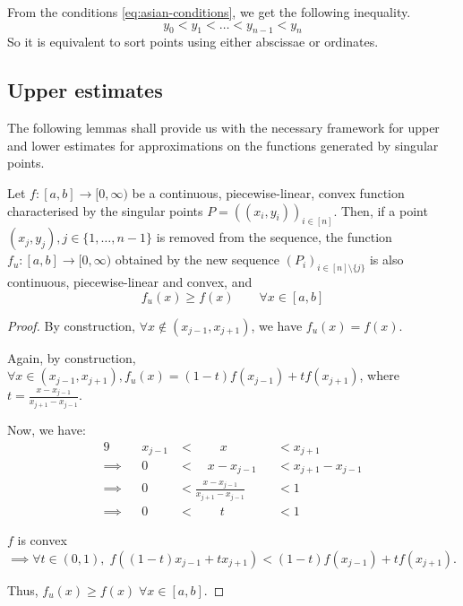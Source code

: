 \begin{rem}
	From the conditions \ref{eq:asian-conditions}, we get the following inequality.
	\begin{equation*}
		y_0 < y_1 < \dots < y_{n-1} < y_n
	\end{equation*}
	So it is equivalent to sort points using either abscissae or ordinates.
\end{rem}



\subsection{Upper estimates}
\label{subsec:asian-upper-estimates}

The following lemmas shall provide us with the necessary framework for upper and lower estimates for approximations on the functions generated by singular points.

\begin{lmm}
	\label{lmm:asian-upper-estimate}
	Let $ f:[a,b] \to [0, \infty) $ be a continuous, piecewise-linear, convex function characterised by the singular points $ P = ( (x_i, y_i) )_{i \in [n]} $. Then, if a point $ (x_j, y_j), j \in \{ 1, \dots, n-1\} $ is removed from the sequence, the function $ f_u: [a,b] \to [0, \infty) $ obtained by the new sequence $ (P_i)_{i \in [n] \setminus \{ j \}} $ is also continuous, piecewise-linear and convex, and
	\begin{equation}
		f_u(x) \ge f(x) \qquad \forall x \in [a,b]
	\end{equation}
\end{lmm}

\begin{proof}
	By construction, $ \forall x \notin ( x_{j-1} , x_{j+1} ) $, we have $ f_u(x) = f(x) $.
	
	Again, by construction, $ \forall x \in ( x_{j-1} , x_{j+1} ), f_u(x) = (1-t) f(x_{j-1}) + t f(x_{j+1}) $, where $ t = \frac{ x - x_{j-1} }{ x_{j+1} - x_{j-1} } $.
	
	Now, we have:
	\begin{alignat*}{9}
		          && x_{j-1}  & <  \qquad x          && <  x_{j+1} \\
		\implies  &&       0  & <  \quad x - x_{j-1} && <  x_{j+1} - x_{j-1} \\
		\implies  &&       0  & <  \frac{ x - x_{j-1} }{ x_{j+1} - x_{j-1} } && <  1 \\
		\implies  &&       0  & <  \qquad t          && <  1
	\end{alignat*}
	
	$f$ is convex $\implies \forall t \in (0,1), \; f( (1-t) x_{j-1} + t x_{j+1} ) < (1-t) f(x_{j-1}) + t f(x_{j+1}) $.
	
	Thus, $ f_u(x) \ge f(x) \; \forall x \in [a,b]$.
\end{proof}

